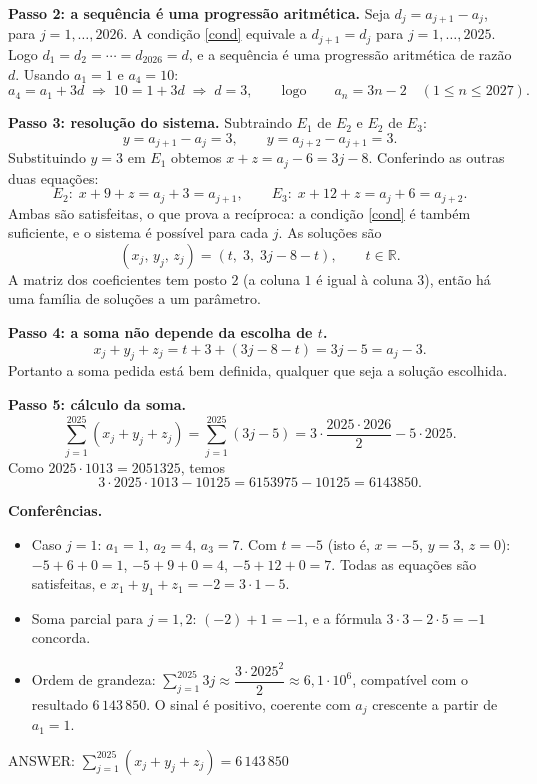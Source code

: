 \documentclass{article}%
\begin{document}
\textbf{Passo 2: a sequência é uma progressão aritmética.} Seja $d_j=a_{j+1}-a_j$, para $j=1,\ldots,2026$. A condição \eqref{cond} equivale a $d_{j+1}=d_j$ para $j=1,\ldots,2025$. Logo $d_1=d_2=\cdots=d_{2026}=d$, e a sequência é uma progressão aritmética de razão $d$. Usando $a_1=1$ e $a_4=10$:
\[
a_4=a_1+3d \;\Rightarrow\; 10=1+3d \;\Rightarrow\; d=3,
\qquad\text{logo}\qquad a_n=3n-2 \quad (1\le n\le 2027).
\]

\textbf{Passo 3: resolução do sistema.} Subtraindo $E_1$ de $E_2$ e $E_2$ de $E_3$:
\[
y=a_{j+1}-a_j=3, \qquad y=a_{j+2}-a_{j+1}=3.
\]
Substituindo $y=3$ em $E_1$ obtemos $x+z=a_j-6=3j-8$. Conferindo as outras duas equações:
\[
E_2:\; x+9+z=a_j+3=a_{j+1}, \qquad E_3:\; x+12+z=a_j+6=a_{j+2}.
\]
Ambas são satisfeitas, o que prova a recíproca: a condição \eqref{cond} é também suficiente, e o sistema é possível para cada $j$. As soluções são
\[
(x_j,\,y_j,\,z_j)=(t,\;3,\;3j-8-t), \qquad t\in\mathbb{R}.
\]
A matriz dos coeficientes tem posto $2$ (a coluna $1$ é igual à coluna $3$), então há uma família de soluções a um parâmetro.

\textbf{Passo 4: a soma não depende da escolha de $t$.}
\[
x_j+y_j+z_j=t+3+(3j-8-t)=3j-5=a_j-3.
\]
Portanto a soma pedida está bem definida, qualquer que seja a solução escolhida.

\textbf{Passo 5: cálculo da soma.}
\begin{equation*}
\sum_{j=1}^{2025}(x_j+y_j+z_j)=\sum_{j=1}^{2025}(3j-5)
=3\cdot\frac{2025\cdot 2026}{2}-5\cdot 2025.
\end{equation*}
Como $2025\cdot 1013=2051325$, temos
\[
3\cdot 2025\cdot 1013-10125=6153975-10125=6143850.
\]

\textbf{Conferências.}
\begin{itemize}
\item Caso $j=1$: $a_1=1$, $a_2=4$, $a_3=7$. Com $t=-5$ (isto é, $x=-5$, $y=3$, $z=0$): $-5+6+0=1$, $-5+9+0=4$, $-5+12+0=7$. Todas as equações são satisfeitas, e $x_1+y_1+z_1=-2=3\cdot 1-5$.
\item Soma parcial para $j=1,2$: $(-2)+1=-1$, e a fórmula $3\cdot 3-2\cdot 5=-1$ concorda.
\item Ordem de grandeza: $\sum_{j=1}^{2025}3j\approx \dfrac{3\cdot 2025^2}{2}\approx 6{,}1\cdot 10^{6}$, compatível com o resultado $6\,143\,850$. O sinal é positivo, coerente com $a_j$ crescente a partir de $a_1=1$.
\end{itemize}

ANSWER: $\displaystyle\sum_{j=1}^{2025}(x_j+y_j+z_j)=6\,143\,850$
%
\newpage%
\end{document}
